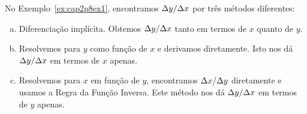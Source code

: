 No Exemplo~\ref{ex:cap2p8ex1}, encontramos $\Delta{y}/\Delta{x}$ por três métodos diferentes:
\begin{enumerate}[(a)]
\item Diferenciação implícita. Obtemos $\Delta{y}/\Delta{x}$ tanto em termos de $x$ quanto
de $y$.
\item Resolvemos para $y$ como função de $x$ e derivamos diretamente. Isto nos
dá $\Delta{y}/\Delta{x}$ em termos de $x$ apenas.
\item Resolvemos para $x$ em função de $y$, encontramos $\Delta{x}/\Delta{y}$ diretamente
e usamos a Regra da Função Inversa. Este método nos dá $\Delta{y}/\Delta{x}$ em termos de
$y$ apenas.
\end{enumerate}

\begin{chapterproblems}
\end{chapterproblems}



